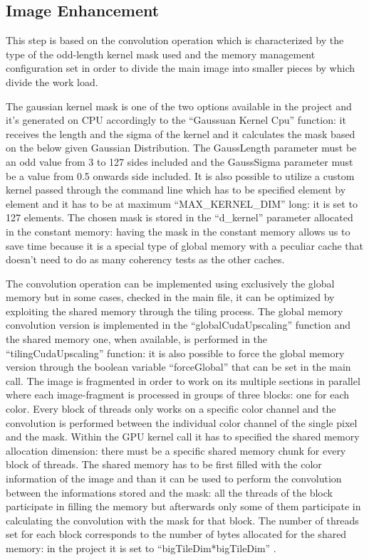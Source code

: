     \subsection{Image Enhancement}

    This step is based on the convolution operation which is characterized by the type of the odd-length kernel mask used 
    and the memory management configuration set in order to divide the main image into smaller pieces by which divide the work load.   
    
    The gaussian kernel mask is one of the two options available in the project and it’s generated on CPU accordingly to the “Gaussuan Kernel Cpu” function: 
    it receives the length and the sigma of the kernel and it calculates the mask based on the below given Gaussian Distribution. 
    The GaussLength parameter must be an odd value from 3 to 127 sides included and the GaussSigma parameter must be a value from 0.5 onwards side included.
    It is also possible to utilize a custom kernel passed through the command line which has to be specified element by element 
    and it has to be at maximum “MAX_KERNEL_DIM”  long: it is set to 127 elements.
    The chosen mask is stored in the “d_kernel” parameter allocated in the constant memory: having the mask in the constant memory allows us to save time 
    because it is a special type of global memory with a peculiar cache that doesn’t need to do as many coherency tests as the other caches.

    The convolution operation can be implemented using exclusively the global memory but in some cases, checked in the main file, it can be optimized by exploiting the shared memory through the tiling process.
    The global memory convolution version is implemented in the “globalCudaUpscaling” function and the shared memory one, when available, is performed in the “tilingCudaUpscaling” function: 
    it is also possible to force the global memory version through the boolean variable “forceGlobal” that can be set in the main call. 
    The image is fragmented in order to work on its multiple sections in parallel where each image-fragment is processed in groups of three blocks: one for each color.
    Every block of threads only works on a specific color channel and the convolution is performed between the individual color channel of the single pixel and the mask. 
    Within the GPU kernel call it has to specified the shared memory allocation dimension: there must be a specific shared memory chunk for every block of threads.  
    The shared memory has to be first filled with the color information of the image and than it can be used to perform the convolution between the informations stored and the mask: 
    all the threads of the block participate in filling the memory but afterwards only some of them participate in calculating the convolution with the mask for that block.
    The number of threads set for each block corresponds to the number of bytes allocated for the shared memory: in the project it is set to “bigTileDim*bigTileDim” . 




